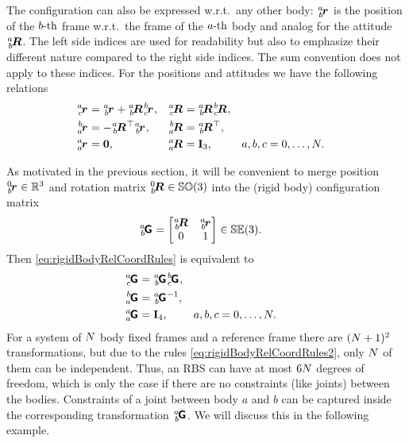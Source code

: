 The configuration can also be expressed w.r.t.\ any other body: $\bodyPos{\BidxI}{\BidxII}$ is the position of the $b\text{-th}$ frame w.r.t.\ the frame of the $a\text{-th}$ body and analog for the attitude $\bodyRot{\BidxI}{\BidxII}$.
The left side indices are used for readability but also to emphasize their different nature compared to the right side indices.
The sum convention does not apply to these indices.
For the positions and attitudes we have the following relations
\begin{subequations}\label{eq:rigidBodyRelCoordRules}
\begin{align}
 \bodyPos{\BidxI}{\BidxIII} &= \bodyPos{\BidxI}{\BidxII} + \bodyRot{\BidxI}{\BidxII} \bodyPos{\BidxII}{\BidxIII},&
 \bodyRot{\BidxI}{\BidxIII} &= \bodyRot{\BidxI}{\BidxII} \bodyRot{\BidxII}{\BidxIII},
\\
 \bodyPos{\BidxII}{\BidxI} &= -\bodyRot{\BidxI}{\BidxII}^\top \bodyPos{\BidxI}{\BidxII},&
 \bodyRot{\BidxII}{\BidxI} &= \bodyRot{\BidxI}{\BidxII}^\top,&
\\
 \bodyPos{\BidxI}{\BidxI} &= \tuple{0},&
 \bodyRot{\BidxI}{\BidxI} &= \idMat[3],&
 \BidxI, \BidxII, \BidxIII &= 0,\ldots,\numRigidBodies.
\end{align}
\end{subequations}

As motivated in the previous section, it will be convenient to merge position $\bodyPos{0}{\BidxII} \in \RealNum^3$ and rotation matrix $\bodyRot{0}{\BidxII} \in \SpecialOrthogonalGroup(3)$ into the (rigid body) configuration matrix
\begin{align}
 \bodyHomoCoord{\BidxI}{\BidxII}{}{} &= \begin{bmatrix} \bodyRot{\BidxI}{\BidxII} & \bodyPos{\BidxI}{\BidxII}{} \\ 0 & 1 \end{bmatrix} \in \SpecialEuclideanGroup(3).
\end{align}
Then \eqref{eq:rigidBodyRelCoordRules} is equivalent to
\begin{subequations}\label{eq:rigidBodyRelCoordRules2}
\begin{align}
 \bodyHomoCoord{\BidxI}{\BidxIII} &= \bodyHomoCoord{\BidxI}{\BidxII} \bodyHomoCoord{\BidxII}{\BidxIII},
\\
 \bodyHomoCoord{\BidxII}{\BidxI} &= \bodyHomoCoord{\BidxI}{\BidxII}^{-1},
 \\
 \bodyHomoCoord{\BidxI}{\BidxI} &= \idMat[4],&
 \BidxI, \BidxII, \BidxIII &= 0,\ldots,\numRigidBodies.
\end{align}
\end{subequations}
For a system of $N$ body fixed frames and a reference frame there are $(N+1)^2$ transformations, but due to the rules \eqref{eq:rigidBodyRelCoordRules2}, only $N$ of them can be independent.
Thus, an RBS can have at most $6N$ degrees of freedom, which is only the case if there are no constraints (like joints) between the bodies.
Constraints of a joint between body $a$ and $b$ can be captured inside the corresponding transformation $\bodyHomoCoord{\BidxI}{\BidxII}{}{}$.
We will discuss this in the following example.

